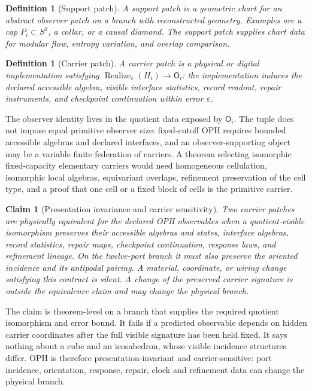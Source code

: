 \documentclass[11pt]{article}
\newtheorem{definition}[theorem]{Definition}
\newtheorem{claim}[theorem]{Claim}
\theoremstyle{remark}
\theoremstyle{plain}
\begin{document}
\begin{definition}[Support patch]
A support patch is a geometric chart for an abstract observer patch on a branch with reconstructed
geometry. Examples are a cap \(P_i\subset S^2\), a collar, or a causal diamond.
The support patch supplies chart data for modular flow, entropy variation, and overlap comparison.
\end{definition}

\begin{definition}[Carrier patch]
A carrier patch is a physical or digital implementation satisfying
\(\operatorname{Realize}_{\varepsilon}(H_i)\to\mathsf O_i\):
the implementation induces the declared accessible algebra, visible interface
statistics, record readout, repair instruments, and checkpoint continuation within error
\(\varepsilon\).
\end{definition}

The observer identity lives in the quotient data exposed by \(\mathsf O_i\).
The tuple does not impose equal primitive observer size: fixed-cutoff OPH
requires bounded accessible algebras and declared interfaces, and an
observer-supporting object may be a variable finite federation of carriers.
A theorem selecting isomorphic fixed-capacity elementary carriers would need
homogeneous cellulation, isomorphic local algebras, equivariant overlaps,
refinement preservation of the cell type, and a proof that one cell or a
fixed block of cells is the primitive carrier.

\begin{claim}[Presentation invariance and carrier sensitivity]\label{claim:implementation-invariance}
Two carrier patches are physically equivalent for the declared OPH observables when a
quotient-visible isomorphism preserves their accessible algebras and states, interface algebras,
record statistics, repair maps, checkpoint continuation, response laws, and refinement lineage.
On the twelve-port branch it must also preserve the oriented incidence and its
antipodal pairing. A material, coordinate, or wiring change satisfying this contract is silent. A
change of the preserved carrier signature is outside the equivalence claim and may change the
physical branch.
\end{claim}

The claim is theorem-level on a branch that supplies the required quotient
isomorphism and error bound. It fails if a predicted observable depends on
hidden carrier coordinates after the full visible signature has been held
fixed. It says nothing about a cube and an icosahedron, whose visible
incidence structures differ. OPH is therefore presentation-invariant and
carrier-sensitive: port incidence, orientation, response, repair, clock and
refinement data can change the physical branch.
\end{document}
